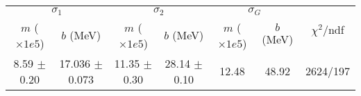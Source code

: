 \begin{tabular}{cc|cc|cc||c}
\multicolumn{2}{c|}{$\sigma_1$} & \multicolumn{2}{|c}{$\sigma_2$} & \multicolumn{2}{|c}{$\sigma_G$}  & \multirow{2}{*}{$\chi^2/$ndf}\\
$m$ ($\times1e5$) & $b$ (MeV) & $m$ ($\times1e5$) & $b$ (MeV) & $m$ ($\times1e5$) & $b$ (MeV) & \\
\hline
8.59 $\pm$ 0.20 & 17.036 $\pm$ 0.073 & 11.35 $\pm$ 0.30 & 28.14 $\pm$ 0.10 & 12.48 & 48.92 & 2624/197\\
\end{tabular}
